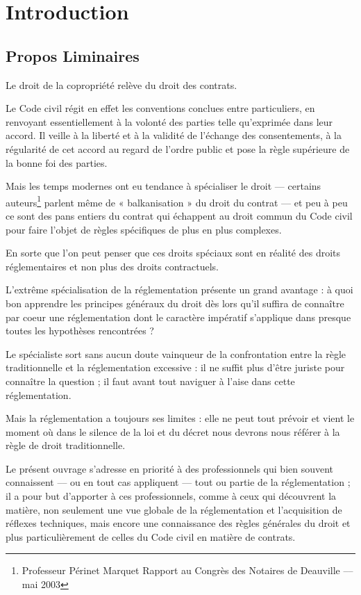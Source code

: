 \chapter*{Introduction}

\section*{Propos Liminaires}
	Le droit de la copropriété relève du droit des contrats.
	
	Le Code civil régit en effet les conventions conclues entre particuliers, en renvoyant essentiellement à la volonté des parties telle qu'exprimée dans leur accord. Il veille à la liberté et à la validité de l’échange des consentements, à la régularité de cet accord au regard de l’ordre public et pose la règle supérieure de la bonne foi des parties.
	
	Mais les temps modernes ont eu tendance à spécialiser le droit --- certains auteurs\footnote{Professeur Périnet Marquet Rapport au Congrès des Notaires de Deauville –-- mai 2003} parlent même de « balkanisation » du droit du contrat --- et peu à peu ce sont des pans entiers du contrat qui échappent au droit commun du Code civil pour faire l'objet de règles spécifiques de plus en plus complexes.
	
	En sorte que l'on peut penser que ces droits spéciaux sont en réalité des droits réglementaires et non plus des droits contractuels.
	
	L'extrême spécialisation de la réglementation présente un grand avantage : à quoi bon apprendre les principes généraux du droit dès lors qu'il suffira de connaître par coeur une réglementation dont le caractère impératif s'applique dans presque toutes les hypothèses rencontrées ?
	
	Le spécialiste sort sans aucun doute vainqueur de la confrontation entre la règle traditionnelle et la réglementation excessive : il ne suffit plus d'être juriste pour connaître la question ; il faut avant tout naviguer à l'aise dans cette réglementation.
	
	Mais la réglementation a toujours ses limites : elle ne peut tout prévoir et vient le moment où dans le silence de la loi et du décret nous devrons nous référer à la règle de droit traditionnelle.
	
	Le présent ouvrage s'adresse en priorité à des professionnels qui bien souvent connaissent –-- ou en tout cas appliquent --- tout ou partie de la réglementation ; il a pour but d'apporter à ces professionnels, comme à ceux qui découvrent la matière, non seulement une vue globale de la réglementation et l'acquisition de réflexes techniques, mais encore une connaissance des règles générales du droit et plus particulièrement de celles du Code civil en matière de contrats.
	
